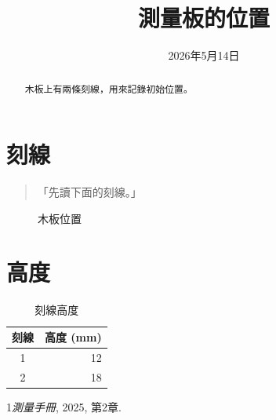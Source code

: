 \documentclass[scheme=chinese,fontset=mac,UTF8]{ctexart}
\begin{document}
\title{測量板的位置}\author{}\date{2026年5月14日}\maketitle
\begin{abstract}木板上有兩條刻線，用來記錄初始位置。\end{abstract}
\tableofcontents
\section{刻線}\begin{quote}「先讀下面的刻線。」\end{quote}
\begin{figure}[ht]\centering\fbox{\rule{0pt}{8mm}\rule{33mm}{0pt}}\caption{木板位置}\end{figure}
\section{高度}
\begin{table}[ht]\centering\begin{tabular}{cr}刻線&高度 (mm)\\\hline 1&12\\2&18\end{tabular}\caption{刻線高度}\end{table}
\begin{thebibliography}{1}\emph{測量手冊}, 2025, 第2章.\end{thebibliography}
\end{document}
